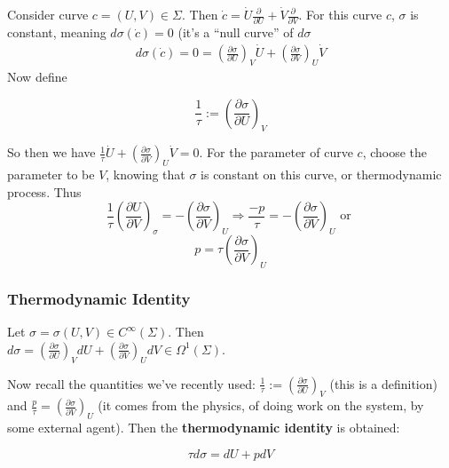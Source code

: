 Consider curve $c = (U,V) \in \Sigma$.  Then $\dot{c} = \dot{U} \frac{ \partial }{ \partial U} + \dot{V}\frac{ \partial }{ \partial V}$.  For this curve $c$, $\sigma$ is constant, meaning $d\sigma(\dot{c}) =0$ (it's a ``null curve'' of $d\sigma$
\[
\begin{gathered}
  d\sigma(\dot{c})=0 = \left( \frac{ \partial \sigma}{ \partial U} \right)_V \dot{U} + \left( \frac{ \partial \sigma}{ \partial V} \right)_U \dot{V} 
\end{gathered}
\]
Now define
\begin{definition}
\begin{equation}
  \frac{1}{\tau} := \left( \frac{ \partial \sigma }{ \partial U} \right)_V
\end{equation}
\end{definition}
So then we have $\frac{1}{\tau} \dot{U} + \left( \frac{ \partial \sigma}{ \partial V} \right)_U \dot{V} =0$.  For the parameter of curve $c$, choose the parameter to be $V$, knowing that $\sigma$ is constant on this curve, or thermodynamic process.  Thus
\[
\frac{1}{\tau} \left( \frac{ \partial U}{ \partial V} \right)_{\sigma} = -\left( \frac{ \partial \sigma}{ \partial V} \right)_U \Longrightarrow \frac{-p}{\tau} = - \left( \frac{ \partial \sigma}{ \partial V} \right)_{U} \text{ or }
\]
\begin{equation}
\boxed{ p = \tau \left( \frac{ \partial \sigma}{ \partial V} \right)_U }
\end{equation}

\subsubsection*{Thermodynamic Identity}

Let $\sigma = \sigma(U,V) \in C^{\infty}(\Sigma)$.  Then \\
\phantom{Let} $d\sigma = \left( \frac{ \partial \sigma}{ \partial U} \right)_V dU + \left( \frac{ \partial \sigma}{ \partial V} \right)_U dV \in \Omega^1(\Sigma)$.  

Now recall the quantities we've recently used: $\frac{1}{\tau} := \left( \frac{ \partial \sigma }{ \partial U} \right)_V$ (this is a definition) and $\frac{p}{\tau} = \left( \frac{ \partial \sigma}{ \partial V} \right)_U$ (it comes from the physics, of doing work on the system, by some external agent).  Then the \textbf{thermodynamic identity} is obtained:

\begin{theorem}\label{Thm:thermodynamicidentity}
\begin{equation}
\boxed{ \tau d\sigma = dU + p dV }
\end{equation}
\end{theorem}


